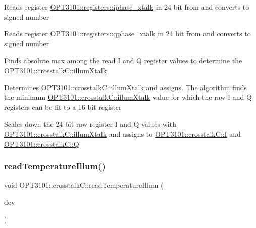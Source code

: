 \begin{DoxyItemize}
\item Reads register \mbox{\hyperlink{class_o_p_t3101_1_1registers_ae87864da6c35bed7c34ebf5f26ba4513}{O\+P\+T3101\+::registers\+::iphase\+\_\+xtalk}} in 24 bit from and converts to signed number
\item Reads register \mbox{\hyperlink{class_o_p_t3101_1_1registers_ad94d98dfb26313a9d32c5c2c0c673693}{O\+P\+T3101\+::registers\+::qphase\+\_\+xtalk}} in 24 bit from and converts to signed number
\item Finds absolute max among the read I and Q register values to determine the \mbox{\hyperlink{class_o_p_t3101_1_1crosstalk_c_a74d3bfbfb7da65511d2d16e1b66a7098}{O\+P\+T3101\+::crosstalk\+C\+::illum\+Xtalk}}
\item Determines \mbox{\hyperlink{class_o_p_t3101_1_1crosstalk_c_a74d3bfbfb7da65511d2d16e1b66a7098}{O\+P\+T3101\+::crosstalk\+C\+::illum\+Xtalk}} and assigns. The algorithm finds the minimum \mbox{\hyperlink{class_o_p_t3101_1_1crosstalk_c_a74d3bfbfb7da65511d2d16e1b66a7098}{O\+P\+T3101\+::crosstalk\+C\+::illum\+Xtalk}} value for which the raw I and Q registers can be fit to a 16 bit register ~\newline

\item Scales down the 24 bit raw register I and Q values with \mbox{\hyperlink{class_o_p_t3101_1_1crosstalk_c_a74d3bfbfb7da65511d2d16e1b66a7098}{O\+P\+T3101\+::crosstalk\+C\+::illum\+Xtalk}} and assigns to \mbox{\hyperlink{class_o_p_t3101_1_1crosstalk_c_a97152b209288a0dc30c4158fdc1815fc}{O\+P\+T3101\+::crosstalk\+C\+::I}} and \mbox{\hyperlink{class_o_p_t3101_1_1crosstalk_c_a1e20d913baf2432ec90fe06a45c226db}{O\+P\+T3101\+::crosstalk\+C\+::Q}} 
\end{DoxyItemize}\mbox{\label{class_o_p_t3101_1_1crosstalk_c_ad9045229556d3fe0c840e0e1113333d4}} 
\subsubsection{\texorpdfstring{read\+Temperature\+Illum()}{readTemperatureIllum()}}
{\footnotesize\ttfamily void O\+P\+T3101\+::crosstalk\+C\+::read\+Temperature\+Illum (\begin{DoxyParamCaption}\item[{\mbox{\hyperlink{class_o_p_t3101_1_1device}{O\+P\+T3101\+::device}} $\ast$}]{dev }\end{DoxyParamCaption})}



